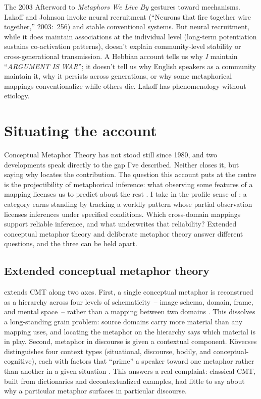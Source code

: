 \documentclass[12pt]{article}
\newcommand{\metaphor}[1]{\enquote{\textit{\MakeUppercase{#1}}}}
\begin{document}
The 2003 Afterword to \emph{Metaphors We Live By} gestures toward mechanisms. Lakoff and Johnson invoke neural recruitment (\enquote{Neurons that fire together wire together,} 2003:~256) and stable conventional systems. But neural recruitment, while it does maintain associations at the individual level (long-term potentiation sustains co-activation patterns), doesn't explain community-level stability or cross-generational transmission. A Hebbian account tells us why \emph{I} maintain \metaphor{argument is war}; it doesn't tell us why English speakers as a community maintain it, why it persists across generations, or why some metaphorical mappings conventionalize while others die. Lakoff has phenomenology without etiology.

\section{Situating the account}
\label{sec:situating}

Conceptual Metaphor Theory has not stood still since 1980, and two developments speak directly to the gap I've described. Neither closes it, but saying why locates the contribution. The question this account puts at the centre is the projectibility of metaphorical inference: what observing some features of a mapping licenses us to predict about the rest \citep{Goodman1955}. I take  in the profile sense of \textcite{reynolds2026kindsProjectibilityProfiles}: a category earns standing by tracking a worldly pattern whose partial observation licenses inferences under specified conditions. Which cross-domain mappings support reliable inference, and what underwrites that reliability? Extended conceptual metaphor theory and deliberate metaphor theory answer different questions, and the three can be held apart.

\subsection{Extended conceptual metaphor theory}

\textcite{kovecses2017, kovecses2020} extends CMT along two axes. First, a single conceptual metaphor is reconstrued as a hierarchy across four levels of schematicity~-- image schema, domain, frame, and mental space~-- rather than a mapping between two domains \citep{kovecses2017}. This dissolves a long-standing grain problem: source domains carry more material than any mapping uses, and locating the metaphor on the hierarchy says which material is in play. Second, metaphor in discourse is given a contextual component. Kövecses distinguishes four context types (situational, discourse, bodily, and conceptual-cognitive), each with factors that \enquote{prime} a speaker toward one metaphor rather than another in a given situation \citep{kovecses2015, kovecses2020}. This answers a real complaint: classical CMT, built from dictionaries and decontextualized examples, had little to say about why a particular metaphor surfaces in particular discourse.
\end{document}
